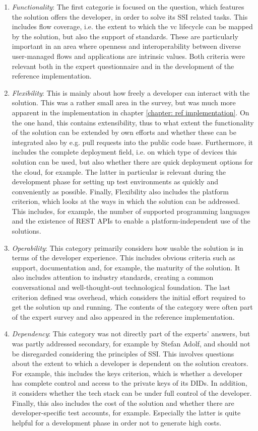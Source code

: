     \begin{enumerate}
        \item \textit{Functionality}: The first categorie is focused on the question, which features the solution offers the developer, in order to solve its \ac{SSI} related tasks. This includes flow coverage, i.e. the extent to which the \ac{vc} lifecycle can be mapped by the solution, but also the support of standards. These are particularly important in an area where openness and interoperability between diverse user-managed flows and applications are intrinsic values. Both criteria were relevant both in the expert questionnaire and in the development of the reference implementation.
        \item \textit{Flexibility}: This is mainly about how freely a developer can interact with the solution. This was a rather small area in the survey, but was much more apparent in the implementation in chapter \ref{chapter: ref implementation}. On the one hand, this contains extensibility, thus to what extent the functionality of the solution can be extended by own efforts and whether these can be integrated also by e.g. pull requests into the public code base. Furthermore, it includes the complete deployment field, i.e. on which type of devices this solution can be used, but also whether there are quick deployment options for the cloud, for example. The latter in particular is relevant during the development phase for setting up test environments as quickly and conveniently as possible. Finally, Flexibility also includes the platform criterion, which looks at the ways in which the solution can be addressed. This includes, for example, the number of supported programming languages and the existence of REST APIs to enable a platform-independent use of the solutions.
        \item \textit{Operability}: This category primarily considers how usable the solution is in terms of the developer experience. This includes obvious criteria such as support, documentation and, for example, the maturity of the solution. It also includes attention to industry standards, creating a common conversational and well-thought-out technological foundation. The last criterion defined was overhead, which considers the initial effort required to get the solution up and running. The contents of the category were often part of the expert survey and also appeared in the reference implementation.
        \item \textit{Dependency}: This category was not directly part of the experts' answers, but was partly addressed secondary, for example by Stefan Adolf, and should not be disregarded considering the principles of \ac{SSI}. This involves questions about the extent to which a developer is dependent on the solution creators. For example, this includes the keys criterion, which is whether a developer has complete control and access to the private keys of its \acp{DID}. In addition, it considers whether the tech stack can be under full control of the developer. Finally, this also includes the cost of the solution and whether there are developer-specific test accounts, for example. Especially the latter is quite helpful for a development phase in order not to generate high costs.

\end{enumerate}
